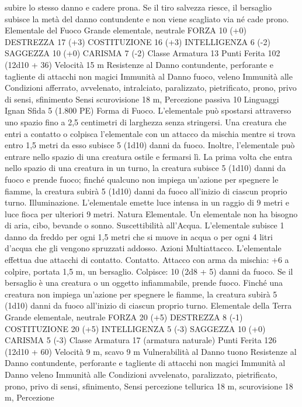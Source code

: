 \begin{multicols}{2}
subire lo stesso danno e cadere prona.
Se il tiro salvezza riesce, il bersaglio subisce la metà del danno
contundente e non viene scagliato via né cade prono.
Elementale del Fuoco
Grande elementale, neutrale
FORZA 10 (+0)
DESTREZZA 17 (+3)
COSTITUZIONE 16 (+3)
INTELLIGENZA 6 (-2)
SAGGEZZA 10 (+0)
CARISMA 7 (-2)
Classe Armatura 13
Punti Ferita 102 (12d10 + 36)
Velocità 15 m
Resistenze al Danno contundente, perforante e tagliente di
attacchi non magici
Immunità al Danno fuoco, veleno
Immunità alle Condizioni afferrato, avvelenato, intralciato,
paralizzato, pietrificato, prono, privo di sensi, sfinimento
Sensi scurovisione 18 m, Percezione passiva 10
Linguaggi Ignan
Sfida 5 (1.800 PE)
Forma di Fuoco. L’elementale può spostarsi attraverso uno
spazio fino a 2,5 centimetri di larghezza senza stringersi. Una
creatura che entri a contatto o colpisca l’elementale con un
attacco da mischia mentre si trova entro 1,5 metri da esso subisce
5 (1d10) danni da fuoco. Inoltre, l’elementale può entrare nello
spazio di una creatura ostile e fermarsi lì. La prima volta che
entra nello spazio di una creatura in un turno, la creatura subisce
5 (1d10) danni da fuoco e prende fuoco; finché qualcuno non
impiega un’azione per spegnere le fiamme, la creatura subirà 5
(1d10) danni da fuoco all’inizio di ciascun proprio turno.
Illuminazione. L’elementale emette luce intensa in un raggio di
9 metri e luce fioca per ulteriori 9 metri.
Natura Elementale. Un elementale non ha bisogno di aria, cibo,
bevande o sonno.
Suscettibilità all’Acqua. L’elementale subisce 1 danno da freddo
per ogni 1,5 metri che si muove in acqua o per ogni 4 litri
d’acqua che gli vengono spruzzati addosso.
Azioni
Multiattacco. L’elementale effettua due attacchi di contatto.
Contatto. Attacco con arma da mischia: +6 a colpire, portata 1,5
m, un bersaglio.
Colpisce: 10 (2d8 + 5) danni da fuoco. Se il bersaglio è una
creatura o un oggetto infiammabile, prende fuoco. Finché una
creatura non impiega un’azione per spegnere le fiamme, la
creatura subirà 5 (1d10) danni da fuoco all’inizio di ciascun
proprio turno.
Elementale della Terra
Grande elementale, neutrale
FORZA 20 (+5)
DESTREZZA 8 (-1)
COSTITUZIONE 20 (+5)
INTELLIGENZA 5 (-3)
SAGGEZZA 10 (+0)
CARISMA 5 (-3)
Classe Armatura 17 (armatura naturale)
Punti Ferita 126 (12d10 + 60)
Velocità 9 m, scavo 9 m
Vulnerabilità al Danno tuono
Resistenze al Danno contundente, perforante e tagliente di
attacchi non magici
Immunità al Danno veleno
Immunità alle Condizioni avvelenato, paralizzato, pietrificato,
prono, privo di sensi, sfinimento,
Sensi percezione tellurica 18 m, scurovisione 18 m, Percezione

\end{multicols}
